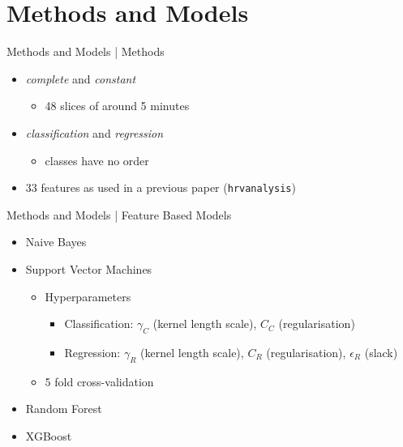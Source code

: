 \documentclass{beamer}
\begin{document}
    \section{Methods and Models}
    \begin{frame}{Methods and Models | Methods}
        \begin{itemize}
            \item \textit{complete} and \textit{constant}
            \begin{itemize}
                \item 48 slices of around 5 minutes
            \end{itemize}
            \item \textit{classification} and \textit{regression}
            \begin{itemize}
                \item classes have no order
            \end{itemize}
            \item 33 features as used in a previous paper (\texttt{hrvanalysis})
        \end{itemize}
    \end{frame}
    
    \begin{frame}{Methods and Models | Feature Based Models}
        \begin{itemize}
            \item Naive Bayes
            \item Support Vector Machines
            \begin{itemize}
                \item Hyperparameters
                \begin{itemize}
                    \item Classification: $\gamma_C$ (kernel length scale), $C_C$ (regularisation)
                    \item Regression: $\gamma_R$ (kernel length scale), $C_R$ (regularisation), $\epsilon_R$ (slack)
                \end{itemize}
                \item 5 fold cross-validation
            \end{itemize}
            \item Random Forest
            \item XGBoost
        \end{itemize}
    \end{frame}
    
\end{document}
